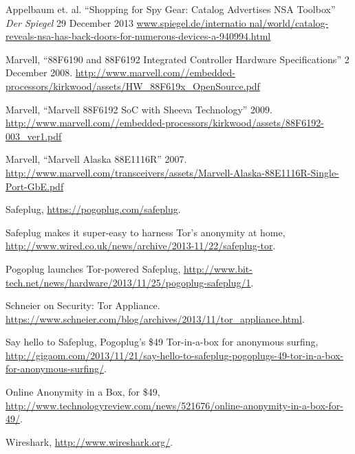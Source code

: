 \begin{thebibliography}{99}

 Appelbaum et. al. ``Shopping for Spy Gear: Catalog Advertises 
NSA Toolbox'' \emph{Der Spiegel} 29 December 2013 \url{www.spiegel.de/internatio
nal/world/catalog-reveals-nsa-has-back-doors-for-numerous-devices-a-940994.html}

 Marvell, ``88F6190 and 88F6192 Integrated Controller Hardware Specifications'' 2 December 2008. \url{http://www.marvell.com//embedded-processors/kirkwood/assets/HW_88F619x_OpenSource.pdf}

 Marvell, ``Marvell 88F6192 SoC with Sheeva Technology'' 2009. \url{http://www.marvell.com//embedded-processors/kirkwood/assets/88F6192-003_ver1.pdf}

 Marvell, ``Marvell Alaska 88E1116R'' 2007. \url{http://www.marvell.com/transceivers/assets/Marvell-Alaska-88E1116R-Single-Port-GbE.pdf}

 Safeplug, \url{https://pogoplug.com/safeplug}.

 Safeplug makes it super-easy to harness Tor's anonymity at home, \url{http://www.wired.co.uk/news/archive/2013-11/22/safeplug-tor}.

 Pogoplug launches Tor-powered Safeplug, \url{http://www.bit-tech.net/news/hardware/2013/11/25/pogoplug-safeplug/1}.

 Schneier on Security: Tor Appliance.  \url{https://www.schneier.com/blog/archives/2013/11/tor_appliance.html}.

 Say hello to Safeplug, Pogoplug’s \$49 Tor-in-a-box for anonymous surfing, \url{http://gigaom.com/2013/11/21/say-hello-to-safeplug-pogoplugs-49-tor-in-a-box-for-anonymous-surfing/}.

 Online Anonymity in a Box, for \$49, \url{http://www.technologyreview.com/news/521676/online-anonymity-in-a-box-for-49/}.

 Wireshark, \url{http://www.wireshark.org/}. 

\end{thebibliography}
